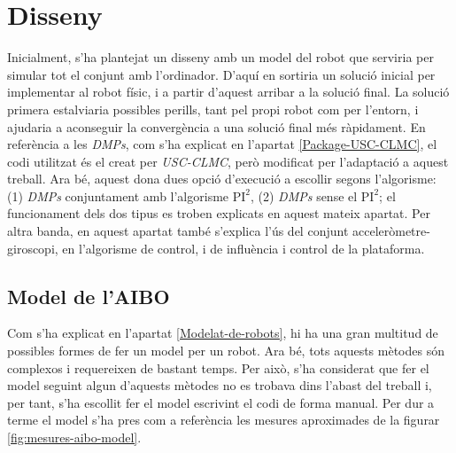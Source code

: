 \documentclass[12pt,a4paper,final,twoside]{report}
\begin{document}
\newpage
\chapter{Disseny}

Inicialment, s'ha plantejat un disseny amb un model del robot que serviria per simular tot el conjunt amb l'ordinador. D'aquí en sortiria un solució inicial per implementar al robot físic, i a partir d'aquest arribar a la solució final. La solució primera estalviaria possibles perills, tant pel propi robot com per l'entorn, i ajudaria a aconseguir la convergència a una solució final més ràpidament. En referència a les \textit{DMPs}, com s'ha explicat en l'apartat \ref{Package-USC-CLMC}, el codi utilitzat és el creat per \textit{USC-CLMC}, però modificat per l'adaptació a aquest treball. Ara bé, aquest dona dues opció d'execució a escollir segons l'algorisme: (1) \textit{DMPs} conjuntament amb l'algorisme $\mathrm{PI^2}$, (2) \textit{DMPs} sense el $\mathrm{PI^2}$; el funcionament dels dos tipus es troben explicats en aquest mateix apartat. Per altra banda, en aquest apartat també s'explica l'ús del conjunt acceleròmetre-giroscopi, en l'algorisme de control, i de influència i control de la plataforma.






\section{Model de l'AIBO}

Com s'ha explicat en l'apartat \ref{Modelat-de-robots}, hi ha una gran multitud de possibles formes de fer un model per un robot. Ara bé, tots aquests mètodes són complexos i requereixen de bastant temps. Per això, s'ha considerat que fer el model seguint algun d'aquests mètodes no es trobava dins l'abast del treball i, per tant, s'ha escollit fer el model escrivint el codi de forma manual. Per dur a terme el model s'ha pres com a referència les mesures aproximades de la figurar \ref{fig:mesures-aibo-model}.
\end{document}
